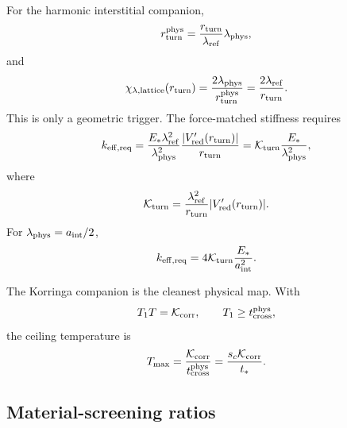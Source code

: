 For the harmonic interstitial companion,
\begin{equation}
\label{eq:part08-stage253-physical-radius}
r_{\rm turn}^{\rm phys}=\frac{r_{\rm turn}}{\lambda_{\rm ref}}\lambda_{\rm phys},
\end{equation}
and
\begin{equation}
\label{eq:part08-stage253-chi-lattice}
\chi_{\lambda,{\rm lattice}}(r_{\rm turn})
=
\frac{2\lambda_{\rm phys}}{r_{\rm turn}^{\rm phys}}
=
\frac{2\lambda_{\rm ref}}{r_{\rm turn}}.
\end{equation}
This is only a geometric trigger.  The force-matched stiffness requires
\begin{equation}
\label{eq:part08-stage253-force-match}
k_{\rm eff,req}
=
\frac{E_*\lambda_{\rm ref}^{2}}{\lambda_{\rm phys}^{2}}
\frac{|V_{\rm red}'(r_{\rm turn})|}{r_{\rm turn}}
=
\mathcal K_{\rm turn}\frac{E_*}{\lambda_{\rm phys}^{2}},
\end{equation}
where
\begin{equation}
\label{eq:part08-stage253-kturn}
\mathcal K_{\rm turn}=\frac{\lambda_{\rm ref}^{2}}{r_{\rm turn}}|V_{\rm red}'(r_{\rm turn})|.
\end{equation}
For \(\lambda_{\rm phys}=a_{\rm int}/2\),
\begin{equation}
\label{eq:part08-stage253-k-aint}
k_{\rm eff,req}=4\mathcal K_{\rm turn}\frac{E_*}{a_{\rm int}^{2}}.
\end{equation}

The Korringa companion is the cleanest physical map.  With
\begin{equation}
\label{eq:part08-stage253-korringa}
T_1T=\mathcal K_{\rm corr},
\qquad
T_1\ge t_{\rm cross}^{\rm phys},
\end{equation}
the ceiling temperature is
\begin{equation}
\label{eq:part08-stage253-tmax}
T_{\max}=\frac{\mathcal K_{\rm corr}}{t_{\rm cross}^{\rm phys}}
=\frac{s_c\mathcal K_{\rm corr}}{t_*}.
\end{equation}

\subsection{Material-screening ratios}
\label{subsec:part08-stage253-screening-ratios}

